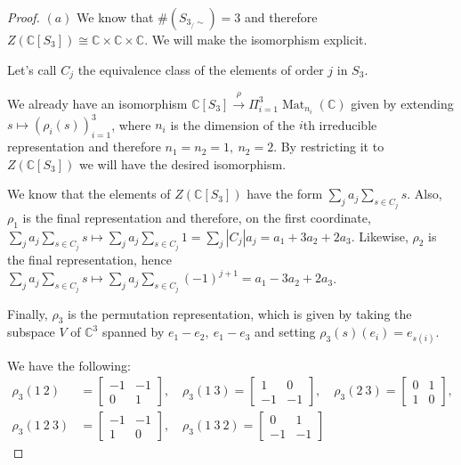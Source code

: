 \documentclass{article}
\newcommand{\numberset}{\mathbb}
\newcommand{\C}{\numberset{C}}
\DeclareMathOperator{\Mat}{Mat}
\begin{document}
\begin{proof}
    $(a)$ We know that $\#(S_{3_/\sim})=3$ and therefore
    $Z(\C[S_3])\cong\C\times\C\times\C$. We will make the isomorphism explicit.

    Let's call $C_j$ the equivalence class of the elements of order $j$ in
    $S_3$.

    We already have an isomorphism
    $\C[S_3]\xrightarrow{\rho}\Pi_{i=1}^3\Mat_{n_i}(\C)$ given by extending
    $s\mapsto(\rho_i(s))_{i=1}^3$, where $n_i$ is the dimension of the $i$th
    irreducible representation and therefore $n_1=n_2=1,\ n_2=2$. By restricting
    it to $Z(\C[S_3])$ we will have the desired isomorphism.

    We know that the elements of $Z(\C[S_3])$ have the form $\sum_ja_j\sum_{s\in
    C_j}s$. Also, $\rho_1$ is the final representation
    and therefore, on the first coordinate, $\sum_ja_j\sum_{s\in
    C_j}s\mapsto\sum_ja_j\sum_{s\in C_j}1=\sum_j|C_j|a_j=
    a_1+3a_2+2a_3$. Likewise, $\rho_2$ is the final representation, hence
    $\sum_ja_j\sum_{s\in C_j}s\mapsto\sum_ja_j\sum_{s\in C_j}(-1)^{j+1}=
    a_1-3a_2+2a_3$.

    Finally, $\rho_3$ is the permutation representation, which is given by
    taking the subspace $V$ of $\C^3$ spanned by $e_1-e_2,\ e_1-e_3$ and setting
    $\rho_3(s)(e_i)=e_{s(i)}$.

    We have the following:
    \begin{align*}
        \rho_3(1\ 2)&=\begin{bmatrix}
            -1 & -1 \\
            0 & 1
        \end{bmatrix},\quad
        \rho_3(1\ 3)=\begin{bmatrix}
            1 & 0 \\
            -1 & -1
        \end{bmatrix},\quad
        \rho_3(2\ 3)=\begin{bmatrix}
            0 & 1 \\
            1 & 0
        \end{bmatrix}, \\
        \rho_3(1\ 2\ 3)&=\begin{bmatrix}
            -1 & -1 \\
            1 & 0
        \end{bmatrix},\quad
        \rho_3(1\ 3\ 2)=\begin{bmatrix}
            0 & 1 \\
            -1 & -1
        \end{bmatrix}
    \end{align*}


\end{proof}
\end{document}
